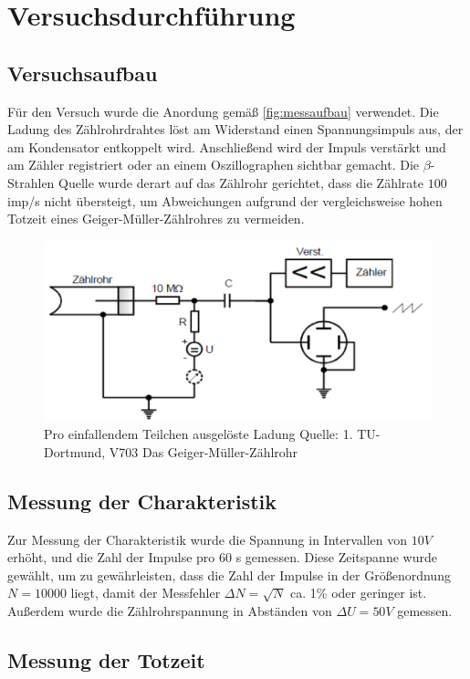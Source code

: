 \section{Versuchsdurchführung}
\subsection{Versuchsaufbau}
Für den Versuch wurde die Anordung gemäß \autoref{fig:messaufbau} verwendet. Die Ladung des Zählrohrdrahtes löst am 
Widerstand einen Spannungsimpuls aus, der am Kondensator entkoppelt wird. Anschließend wird der Impuls 
verstärkt und am Zähler registriert oder an einem Oszillographen sichtbar gemacht. Die $\beta$-Strahlen 
Quelle wurde derart auf das Zählrohr gerichtet, dass die Zählrate $100$ imp/s nicht übersteigt, um 
Abweichungen aufgrund der vergleichsweise hohen Totzeit eines Geiger-Müller-Zählrohres zu vermeiden.
\begin{figure}
    \centering
    \includegraphics{Messaufbau.pdf}
    \caption{Pro einfallendem Teilchen ausgelöste Ladung Quelle: 1. TU-Dortmund, V703 Das Geiger-Müller-Zählrohr}
    \label{fig:messaufbau}
  \end{figure}
\subsection{Messung der Charakteristik}
Zur Messung der Charakteristik wurde die Spannung in Intervallen von $10 V$ erhöht, und die Zahl der Impulse 
pro 60 s gemessen. Diese Zeitspanne wurde gewählt, um zu gewährleisten, dass die Zahl der Impulse in der 
Größenordnung $N=10000$  liegt, damit der Messfehler $\Delta N=\sqrt{N}$ ca. 1\% oder geringer ist. 
Außerdem wurde die Zählrohrspannung in Abständen von $\Delta U=50 V$ gemessen.
\subsection{Messung der Totzeit}
